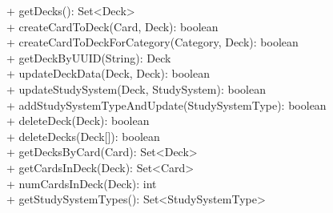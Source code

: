 { 
    + getDecks(): Set<Deck> \\
    + createCardToDeck(Card, Deck): boolean \\
    + createCardToDeckForCategory(Category, Deck): boolean \\
    + getDeckByUUID(String): Deck \\
    + updateDeckData(Deck, Deck): boolean \\
    + updateStudySystem(Deck, StudySystem): boolean \\
    + addStudySystemTypeAndUpdate(StudySystemType): boolean \\
    + deleteDeck(Deck): boolean \\
    + deleteDecks(Deck[]): boolean \\
    + getDecksByCard(Card): Set<Deck> \\
    + getCardsInDeck(Deck): Set<Card> \\
    + numCardsInDeck(Deck): int \\
    + getStudySystemTypes(): Set<StudySystemType> \\
}{}
